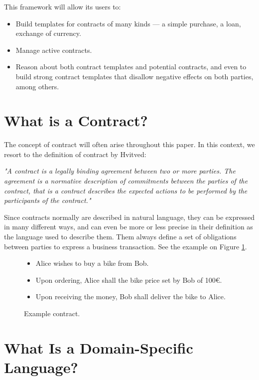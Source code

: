 \documentclass{ituthesis}
\begin{document}
This framework will allow its users to:
\begin{itemize}
    \item Build templates for contracts of many kinds --- a simple purchase, a loan, exchange of currency.
    \item Manage active contracts.
    \item Reason about both contract templates and potential contracts, and even to build strong contract templates that disallow negative effects on both parties, among others.
\end{itemize}

\section{What is a Contract?}
\label{contract}
The concept of contract will often arise throughout this paper. In this context, we resort to the definition of contract by Hvitved:
\begin{displayquote}
\textit{"A contract is a legally binding agreement between two or more parties. The agreement is a normative description of commitments between the parties of the contract, that is a contract describes the expected actions to be performed by the participants of the contract."}
\cite{hvitved2011contract}
\end{displayquote}

Since contracts normally are described in natural language, they can be expressed in many different ways, and can even be more or less precise in their definition as the language used to describe them. Them always define a set of obligations between parties to express a business transaction. See the example on Figure \ref{fig:exampleContract}. 
\begin{figure}[!h]
\begin{tcolorbox}
\begin{itemize}
    \item Alice wishes to buy a bike from Bob.
    \item Upon ordering, Alice shall the bike price set by Bob of 100€.
    \item Upon receiving the money, Bob shall deliver the bike to Alice.
\end{itemize}
\end{tcolorbox}
\caption{Example contract.}
\label{fig:exampleContract}
\end{figure}

\section{What Is a Domain-Specific Language?}
\end{document}
